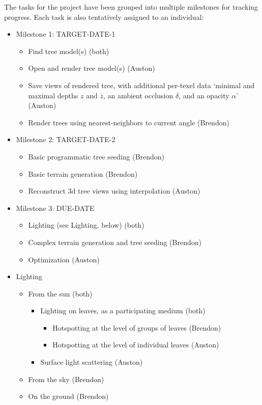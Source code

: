 \documentclass{article}
\begin{document}
The tasks for the project have been grouped into multiple milestones for tracking progress.  Each task is also tentatively assigned to an individual:

\begin{itemize}
\item Milestone 1: TARGET-DATE-1
\begin{itemize}
\item Find tree model(s) (both)
\item Open and render tree model(s) (Auston)
\item Save views of rendered tree, with additional per-texel data ‘minimal and maximal depths $z$ and $\bar{z}$, an ambient occlusion $\delta$, and an opacity $\alpha$’\cite{trees} (Auston)
\item Render trees using nearest-neighbors to current angle (Brendon)
\end{itemize}

\item Milestone 2: TARGET-DATE-2
\begin{itemize}
\item Basic programmatic tree seeding (Brendon)
\item Basic terrain generation (Brendon)
\item Reconstruct 3d tree views using interpolation (Auston)
\end{itemize}

\item Milestone 3: DUE-DATE
\begin{itemize}
\item Lighting (see Lighting, below) (both)
\item Complex terrain generation and tree seeding (Brendon)
\item Optimization (Auston)
\end{itemize}

\item Lighting
\begin{itemize}
\item From the sun (both)
\begin{itemize}
\item Lighting on leaves, as a participating medium (both)
\begin{itemize}
\item Hotspotting at the level of groups of leaves (Brendon)
\item Hotspotting at the level of individual leaves (Auston)
\end{itemize}

\item Surface light scattering (Auston)
\end{itemize}

\item From the sky (Brendon)
\item On the ground (Brendon)
\end{itemize}

\end{itemize}
\end{document}
